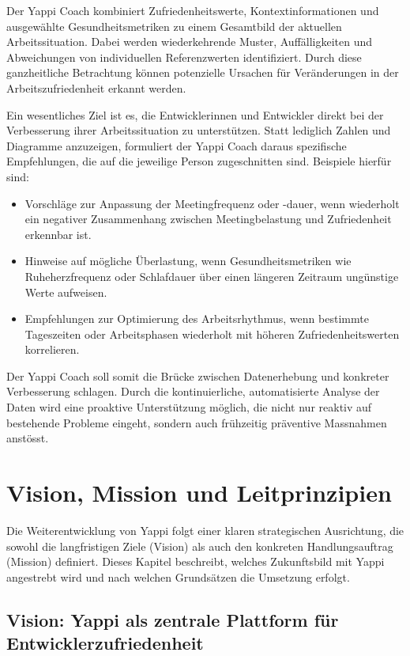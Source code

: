 \documentclass[12pt,a4paper]{report}
\begin{document}
Der Yappi Coach kombiniert Zufriedenheitswerte, Kontextinformationen und ausgewählte Gesundheitsmetriken zu einem Gesamtbild der
aktuellen Arbeitssituation. Dabei werden wiederkehrende Muster, Auffälligkeiten und Abweichungen von individuellen Referenzwerten
identifiziert. Durch diese ganzheitliche Betrachtung können potenzielle Ursachen für Veränderungen in der Arbeitszufriedenheit
erkannt werden.

Ein wesentliches Ziel ist es, die Entwicklerinnen und Entwickler direkt bei der Verbesserung ihrer Arbeitssituation zu 
unterstützen. Statt lediglich Zahlen und Diagramme anzuzeigen, formuliert der Yappi Coach daraus spezifische Empfehlungen, die 
auf die jeweilige Person zugeschnitten sind. Beispiele hierfür sind:

\begin{itemize}
    \item Vorschläge zur Anpassung der Meetingfrequenz oder -dauer, wenn wiederholt ein negativer Zusammenhang zwischen
      Meetingbelastung und Zufriedenheit erkennbar ist.
    \item Hinweise auf mögliche Überlastung, wenn Gesundheitsmetriken wie Ruheherzfrequenz oder Schlafdauer über einen längeren
      Zeitraum ungünstige Werte aufweisen.
    \item Empfehlungen zur Optimierung des Arbeitsrhythmus, wenn bestimmte Tageszeiten oder Arbeitsphasen wiederholt mit höheren
      Zufriedenheitswerten korrelieren.
\end{itemize}

Der Yappi Coach soll somit die Brücke zwischen Datenerhebung und konkreter Verbesserung schlagen. Durch die kontinuierliche, 
automatisierte Analyse der Daten wird eine proaktive Unterstützung möglich, die nicht nur reaktiv auf bestehende Probleme eingeht,
sondern auch frühzeitig präventive Massnahmen anstösst.

\section{Vision, Mission und Leitprinzipien}

Die Weiterentwicklung von Yappi folgt einer klaren strategischen Ausrichtung, die sowohl die langfristigen Ziele (Vision) als auch 
den konkreten Handlungsauftrag (Mission) definiert. Dieses Kapitel beschreibt, welches Zukunftsbild mit Yappi angestrebt wird und
nach welchen Grundsätzen die Umsetzung erfolgt.

\subsection{Vision: Yappi als zentrale Plattform für Entwicklerzufriedenheit}
\end{document}
